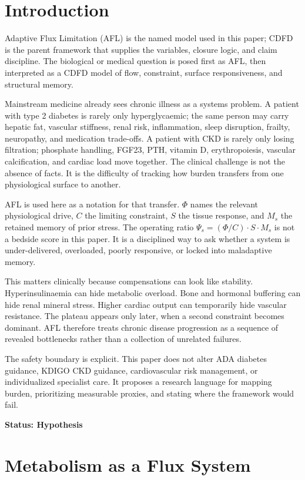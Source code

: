 \documentclass[12pt,a4paper]{article}
\begin{document}
\section{Introduction}

Adaptive Flux Limitation (AFL) is the named model used in this paper; CDFD is the parent framework that supplies the variables, closure logic, and claim discipline. The biological or medical question is posed first as AFL, then interpreted as a CDFD model of flow, constraint, surface responsiveness, and structural memory.

Mainstream medicine already sees chronic illness as a systems problem. A patient with type 2 diabetes is rarely only hyperglycaemic; the same person may carry hepatic fat, vascular stiffness, renal risk, inflammation, sleep disruption, frailty, neuropathy, and medication trade-offs. A patient with CKD is rarely only losing filtration; phosphate handling, FGF23, PTH, vitamin D, erythropoiesis, vascular calcification, and cardiac load move together. The clinical challenge is not the absence of facts. It is the difficulty of tracking how burden transfers from one physiological surface to another.

AFL is used here as a notation for that transfer. $\Phi$ names the relevant physiological drive, $C$ the limiting constraint, $S$ the tissue response, and $M_s$ the retained memory of prior stress. The operating ratio $\Psi_s=(\Phi/C)\cdot S\cdot M_s$ is not a bedside score in this paper. It is a disciplined way to ask whether a system is under-delivered, overloaded, poorly responsive, or locked into maladaptive memory.

This matters clinically because compensations can look like stability. Hyperinsulinaemia can hide metabolic overload. Bone and hormonal buffering can hide renal mineral stress. Higher cardiac output can temporarily hide vascular resistance. The plateau appears only later, when a second constraint becomes dominant. AFL therefore treats chronic disease progression as a sequence of revealed bottlenecks rather than a collection of unrelated failures.

The safety boundary is explicit. This paper does not alter ADA diabetes guidance, KDIGO CKD guidance, cardiovascular risk management, or individualized specialist care. It proposes a research language for mapping burden, prioritizing measurable proxies, and stating where the framework would fail.

\textbf{Status: Hypothesis}

\section{Metabolism as a Flux System}
\end{document}
